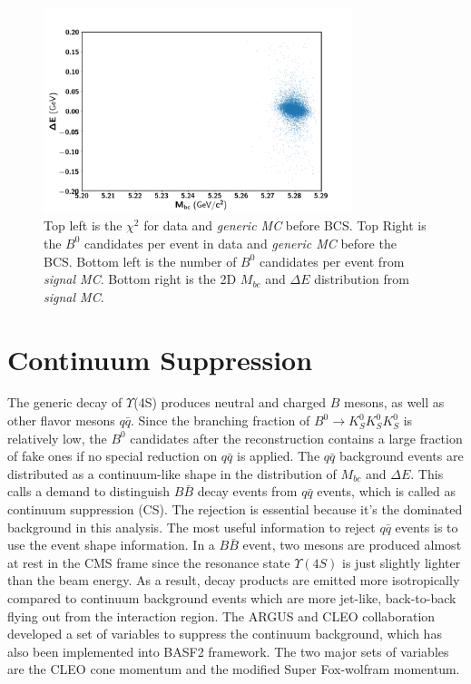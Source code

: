 \begin{figure}[htpb]
\begin{minipage}[b]{0.5\linewidth}
	\end{minipage}
	\begin{minipage}[b]{0.5\linewidth}
		\centering 
		\includegraphics[width=1\linewidth, height=6cm]{figures/hist_sig_MC_Mbc_dE}
		
	\end{minipage}
	
	\caption{Top left is the $\chi^2$ for data and \textit{generic MC} before BCS. Top Right is the $B^0$ candidates per event in data and \textit{generic MC} before the BCS. Bottom left is the number of $B^0$ candidates per event from \textit{signal MC}. Bottom right is the 2D $M_{bc}$ and $\Delta E$ distribution from \textit{signal MC}.}
	\label{fig:b0dist}
\end{figure}
\section{Continuum Suppression}
The generic decay of $\Upsilon$(4S) produces neutral and charged $B$ mesons, as well as other flavor mesons $q\bar{q}$. Since the branching fraction of $B^0 \to K_S^0  K_S^0  K_S^0$ is relatively low, the $B^0$ candidates after the reconstruction contains a large fraction of fake ones if no special reduction on $q\bar{q}$ is applied. 
The $q\bar{q}$ background events are distributed as a continuum-like shape in the distribution of $M_{bc}$ and $\Delta E$. This calls a demand to distinguish $B\bar{B}$ decay events from $q\bar{q}$ events, which is called as continuum suppression (CS). The rejection is essential because it's the dominated background in this analysis. The most useful information to reject $q\bar{q}$ events is to use the event shape information. In a $B\bar{B}$ event, two mesons are produced almost at rest in the CMS frame since the resonance state $\Upsilon(4S)$ is just slightly lighter than the beam energy. As a result, decay products are emitted more isotropically compared to continuum background events which are more jet-like, back-to-back flying out from the interaction region. The ARGUS and CLEO collaboration~\cite{Bevan_2014} developed a set of variables to suppress the continuum background, which has also been implemented into BASF2 framework. The two major sets of variables are the CLEO cone momentum and the modified Super Fox-wolfram momentum.

